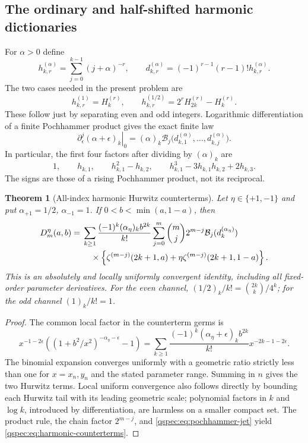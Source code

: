 \documentclass[11pt,letterpaper]{article}
\numberwithin{equation}{section}
\newtheorem{theorem}{Theorem}[section]
\theoremstyle{definition}
\newcommand{\Bcal}{\mathcal B}
\begin{document}
\subsection{The ordinary and half-shifted harmonic dictionaries}
For $\alpha>0$ define
\begin{equation}\label{qspec:eq:shifted-harmonics}
h_{k,r}^{(\alpha)}=\sum_{j=0}^{k-1}(j+\alpha)^{-r},\qquad
 d_{k,r}^{(\alpha)}=(-1)^{r-1}(r-1)!h_{k,r}^{(\alpha)}.
\end{equation}
The two cases needed in the present problem are
\begin{equation}\label{qspec:eq:harmonic-dictionaries}
h_{k,r}^{(1)}=H_k^{(r)},\qquad
h_{k,r}^{(1/2)}=2^r H_{2k}^{(r)}-H_k^{(r)}.
\end{equation}
These follow just by separating even and odd integers. Logarithmic
differentiation of a finite Pochhammer product gives the exact finite law
\begin{equation}\label{qspec:eq:pochhammer-jet}
\left.\partial_\epsilon^j(\alpha+\epsilon)_k\right|_0
=(\alpha)_k\Bcal_j\bigl(d_{k,1}^{(\alpha)},\ldots,d_{k,j}^{(\alpha)}\bigr).
\end{equation}
In particular, the first four factors after dividing by $(\alpha)_k$ are
\[
1,\qquad h_{k,1},\qquad h_{k,1}^2-h_{k,2},\qquad
h_{k,1}^3-3h_{k,1}h_{k,2}+2h_{k,3}.
\]
The signs are those of a rising Pochhammer product, not its reciprocal.

\begin{theorem}[All-index harmonic Hurwitz counterterms]
\label{qspec:thm:harmonic}
Let $\eta\in\{+1,-1\}$ and put $\alpha_{+1}=1/2$, $\alpha_{-1}=1$.
If $0<b<\min(a,1-a)$, then
\begin{align}
D_m^\eta(a,b)={}&\sum_{k\ge1}
 \frac{(-1)^k(\alpha_\eta)_k b^{2k}}{k!}
 \sum_{j=0}^m\binom mj 2^{m-j}\Bcal_j(d_k^{(\alpha_\eta)})\notag\\
&\quad\times\left\{\zeta^{(m-j)}(2k+1,a)
       +\eta\zeta^{(m-j)}(2k+1,1-a)\right\}.
\label{qspec:eq:harmonic-counterterms}
\end{align}
This is an absolutely and locally uniformly convergent identity, including
all fixed-order parameter derivatives. For the even channel,
$(1/2)_k/k!=\binom{2k}{k}/4^k$; for the odd channel $(1)_k/k!=1$.
\end{theorem}
\begin{proof}
The common local factor in the counterterm germs is
\[
x^{-1-2\epsilon}\left((1+b^2/x^2)^{-\alpha_\eta-\epsilon}-1\right)
=\sum_{k\ge1}\frac{(-1)^k(\alpha_\eta+\epsilon)_k b^{2k}}{k!}
 x^{-2k-1-2\epsilon}.
\]
The binomial expansion converges uniformly with a geometric ratio strictly
less than one for $x=x_n,y_n$ and the stated parameter range. Summing in
$n$ gives the two Hurwitz terms. Local uniform convergence also follows
directly by bounding each Hurwitz tail with its leading geometric scale;
polynomial factors in $k$ and $\log k$, introduced by differentiation,
are harmless on a smaller compact set. The product rule, the chain factor
$2^{m-j}$, and \eqref{qspec:eq:pochhammer-jet} yield
\eqref{qspec:eq:harmonic-counterterms}.
\end{proof}
\end{document}
